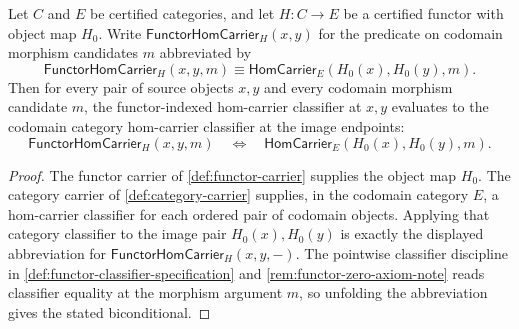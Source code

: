 \begin{theorem}
\label{thm:functor-hom-carrier-codomain-evaluation}
Let \(C\) and \(E\) be certified categories, and let \(H:C\to E\) be a certified functor with object map \(H_0\). Write \(\mathsf{FunctorHomCarrier}_{H}(x,y)\) for the predicate on codomain morphism candidates \(m\) abbreviated by
$$
\mathsf{FunctorHomCarrier}_{H}(x,y,m)
\equiv
\mathsf{HomCarrier}_{E}(H_0(x),H_0(y),m).
$$
Then for every pair of source objects \(x,y\) and every codomain morphism candidate \(m\), the functor-indexed hom-carrier classifier at \(x,y\) evaluates to the codomain category hom-carrier classifier at the image endpoints:
$$
\mathsf{FunctorHomCarrier}_{H}(x,y,m)
\quad\Longleftrightarrow\quad
\mathsf{HomCarrier}_{E}(H_0(x),H_0(y),m).
$$
\end{theorem}
\begin{proof}
The functor carrier of \autoref{def:functor-carrier} supplies the object map \(H_0\). The category carrier of \autoref{def:category-carrier} supplies, in the codomain category \(E\), a hom-carrier classifier for each ordered pair of codomain objects. Applying that category classifier to the image pair \(H_0(x),H_0(y)\) is exactly the displayed abbreviation for \(\mathsf{FunctorHomCarrier}_{H}(x,y,-)\). The pointwise classifier discipline in \autoref{def:functor-classifier-specification} and \autoref{rem:functor-zero-axiom-note} reads classifier equality at the morphism argument \(m\), so unfolding the abbreviation gives the stated biconditional.
\end{proof}

